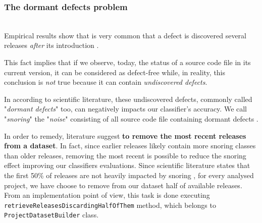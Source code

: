 \documentclass[sigconf]{acmart}
\begin{document}
\subsubsection{The dormant defects problem}
\hfill\\
Empirical results show that is very common that a defect is discovered several releases \textit{after} its introduction \citep{Falessi}. 

This fact implies that if we observe, today, the status of a source code file in its current version, it can be considered as defect-free while, in reality, this conclusion is \textit{not} true because it can contain \textit{undiscovered defects}.

In according to scientific literature, these undiscovered defects, commonly called "\textit{dormant defects}" too, can negatively impacts our classifier's accuracy. We call "\textit{snoring}" the "\textit{noise}" consisting of all source code file containing dormant defects \citep{Falessi}.

In order to remedy, literature suggest \textbf{to remove the most recent releases from a dataset}. In fact, since earlier releases likely contain more snoring classes than older releases, removing the most recent is possible to reduce the snoring effect improving our classifiers evaluations. Since scientific literature states that the first 50\% of releases are not heavily impacted by snoring \citep{Falessi}, for every analysed project, we have choose to remove from our dataset half of available releases. From an implementation point of view, this task is done executing \texttt{retrieve\-Releases\-Discarding\-HalfOfThem} method, which belongs to \texttt{Project\-Dataset\-Builder} class.
\end{document}
